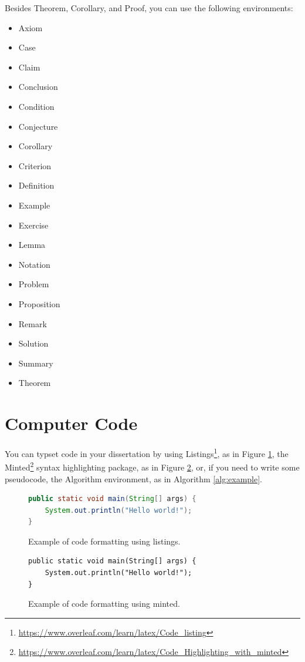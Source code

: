 \documentclass{thesis}
\begin{document}
\noindent Besides Theorem, Corollary, and Proof, you can use the following environments:
\begin{itemize}
    \item Axiom
    \item Case
    \item Claim
    \item Conclusion
    \item Condition
    \item Conjecture
    \item Corollary
    \item Criterion
    \item Definition
    \item Example
    \item Exercise
    \item Lemma
    \item Notation
    \item Problem
    \item Proposition
    \item Remark
    \item Solution
    \item Summary
    \item Theorem
\end{itemize}

\section{Computer Code}

You can typset code in your dissertation by using Listings\footnote{\url{https://www.overleaf.com/learn/latex/Code_listing}}, as in Figure \ref{code:listings}, the Minted\footnote{\url{https://www.overleaf.com/learn/latex/Code_Highlighting_with_minted}} syntax highlighting package, as in Figure \ref{code:minted}, or, if you need to write some pseudocode, the Algorithm environment, as in Algorithm \ref{alg:example}.

\begin{figure}[h]
\begin{lstlisting}[language=Java]
public static void main(String[] args) {
    System.out.println("Hello world!");
}
\end{lstlisting}
\caption{Example of code formatting using listings.}\label{code:listings}
\end{figure}

\begin{figure}[h]
\begin{verbatim}
public static void main(String[] args) {
    System.out.println("Hello world!");
}
\end{verbatim}
\caption{Example of code formatting using minted.}\label{code:minted}
\end{figure}
\end{document}
